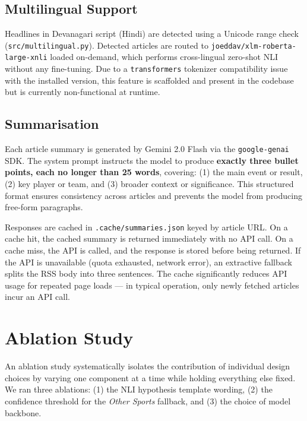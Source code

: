 \documentclass[11pt,a4paper]{article}
\begin{document}
\subsection{Multilingual Support}

Headlines in Devanagari script (Hindi) are detected using a Unicode range check (\texttt{src/multilingual.py}). Detected articles are routed to \texttt{joeddav/xlm-roberta-large-xnli} loaded on-demand, which performs cross-lingual zero-shot NLI without any fine-tuning. Due to a \texttt{transformers} tokenizer compatibility issue with the installed version, this feature is scaffolded and present in the codebase but is currently non-functional at runtime.

\subsection{Summarisation}

Each article summary is generated by Gemini 2.0 Flash via the \texttt{google-genai} SDK. The system prompt instructs the model to produce \textbf{exactly three bullet points, each no longer than 25 words}, covering: (1) the main event or result, (2) key player or team, and (3) broader context or significance. This structured format ensures consistency across articles and prevents the model from producing free-form paragraphs.

Responses are cached in \texttt{.cache/summaries.json} keyed by article URL. On a cache hit, the cached summary is returned immediately with no API call. On a cache miss, the API is called, and the response is stored before being returned. If the API is unavailable (quota exhausted, network error), an extractive fallback splits the RSS body into three sentences. The cache significantly reduces API usage for repeated page loads — in typical operation, only newly fetched articles incur an API call.

\section{Ablation Study}
\label{sec:ablation}

An ablation study systematically isolates the contribution of individual design choices by varying one component at a time while holding everything else fixed. We ran three ablations: (1) the NLI hypothesis template wording, (2) the confidence threshold for the \textit{Other Sports} fallback, and (3) the choice of model backbone.
\end{document}

